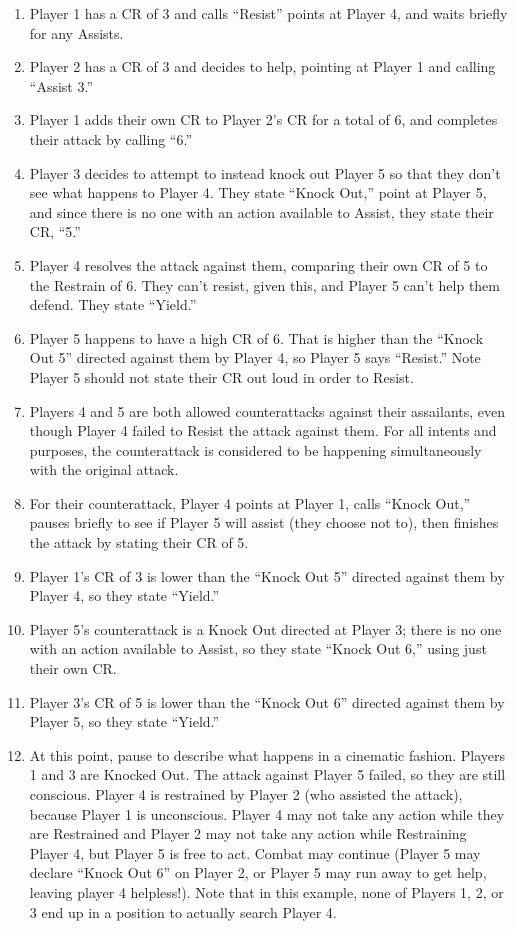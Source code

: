 \documentclass[sheet]{GL2020}
\begin{document}
\begin{enumerate}
	\item Player 1 has a CR of 3 and calls ``Resist'' points at Player 4, and waits briefly for any Assists.
 	\item Player 2 has a CR of 3 and decides to help, pointing at Player 1 and calling ``Assist 3.”
	\item Player 1 adds their own CR to Player 2’s CR for a total of 6, and completes their attack by calling ``6.''
	\item Player 3 decides to attempt to instead knock out Player 5 so that they don’t see what happens to Player 4. They state ``Knock Out,'' point at Player 5, and since there is no one with an action available to Assist, they state their CR, ``5.''
	\item Player 4 resolves the attack against them, comparing their own CR of 5 to the Restrain of 6. They can’t resist, given this, and Player 5 can’t help them defend. They state ``Yield.''
	\item Player 5 happens to have a high CR of 6. That is higher than the ``Knock Out 5'' directed against them by Player 4, so Player 5 says ``Resist.'' Note Player 5 should not state their CR out loud in order to Resist.
	\item Players 4 and 5 are both allowed counterattacks against their assailants, even though Player 4 failed to Resist the attack against them. For all intents and purposes, the counterattack is considered to be happening simultaneously with the original attack.
	\item For their counterattack, Player 4 points at Player 1, calls ``Knock Out,'' pauses briefly to see if Player 5 will assist (they choose not to), then finishes the attack by stating their CR of 5.
	\item Player 1's CR of 3 is lower than the ``Knock Out 5'' directed against them by Player 4, so they state ``Yield.''
	\item Player 5's counterattack is a Knock Out directed at Player 3; there is no one with an action available to Assist, so they state ``Knock Out 6,'' using just their own CR.
	\item Player 3's CR of 5 is lower than the ``Knock Out 6'' directed against them by Player 5, so they state ``Yield.''
	\item At this point, pause to describe what happens in a cinematic fashion. Players 1 and 3 are Knocked Out. The attack against Player 5 failed, so they are still conscious. Player 4 is restrained by Player 2 (who assisted the attack), because Player 1 is unconscious. Player 4 may not take any action while they are Restrained and Player 2 may not take any action while Restraining Player 4, but Player 5 is free to act. Combat may continue (Player 5 may declare ``Knock Out 6'' on Player 2, or Player 5 may run away to get help, leaving player 4 helpless!). Note that in this example, none of Players 1, 2, or 3 end up in a position to actually search Player 4.
\end{enumerate}
\end{document}
